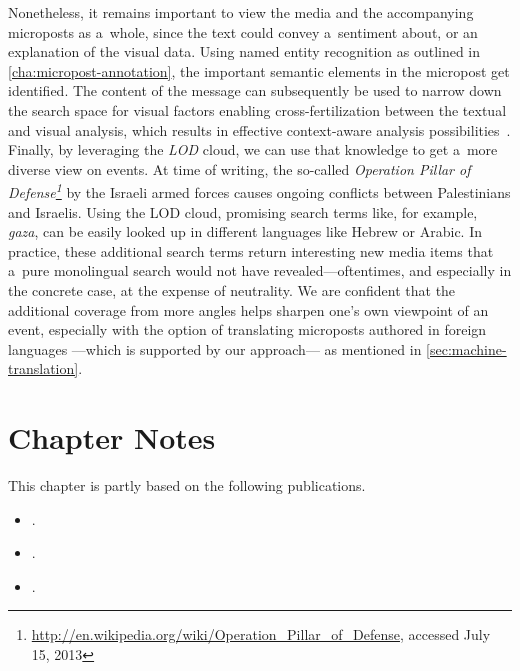 Nonetheless, it remains important to view the media and the
accompanying microposts as a~whole, since the text
could convey a~sentiment about,
or an explanation of the visual data.
Using named entity recognition as outlined in
\autoref{cha:micropost-annotation},
the important semantic elements in the micropost get identified.
The content of the message can subsequently be used
to narrow down the search space for visual factors
enabling cross-fertilization between the textual
and visual analysis, which results in effective context-aware analysis possibilities~\cite{verborgh2012multimediaannotation,rizzo2012whatfresh}.
Finally, by leveraging the \emph{LOD} cloud,
we can use that knowledge to get a~more diverse view on events.
At time of writing, the so-called
\emph{Operation Pillar of
Defense\footnote{\url{http://en.wikipedia.org/wiki/Operation_Pillar_of_Defense}, accessed July 15, 2013}}
by the Israeli armed forces
causes ongoing conflicts between Palestinians and Israelis.
Using the LOD cloud, promising search terms like, for example,
\emph{gaza}, can be easily looked up in different languages
like Hebrew or Arabic.
In practice, these additional search terms return interesting
new media items that a~pure monolingual search
would not have revealed---oftentimes,
and especially in the concrete case,
at the expense of neutrality.
We are confident that the additional coverage
from more angles helps sharpen one's own viewpoint of an event,
especially with the option of translating microposts
authored in foreign languages%
---which is supported by our approach---%
as mentioned in \autoref{sec:machine-translation}.

\section*{Chapter Notes}
This chapter is partly based on the following publications.

\begin{itemize}
  \item {}.
  \item {}.
  \item {}.
\end{itemize}

\clearpage
\printbibliography[heading=subbibliography]